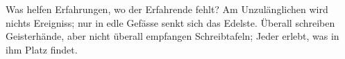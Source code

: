Was helfen Erfahrungen, wo der Erfahrende fehlt? Am Unzulänglichen wird nichts Ereigniss; nur in edle Gefässe senkt sich das Edelste. Überall schreiben Geisterhände, aber nicht überall empfangen Schreibtafeln; Jeder erlebt, was in ihm Platz findet.
\par

